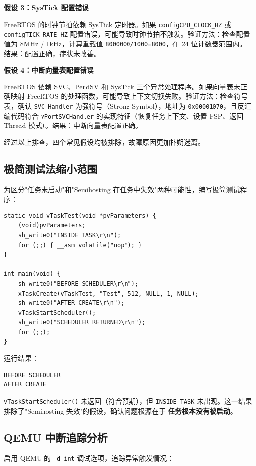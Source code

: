\documentclass[12pt,a4paper]{ctexart}
\begin{document}
\textbf{假设 3：SysTick 配置错误}

FreeRTOS 的时钟节拍依赖 SysTick 定时器。如果 \texttt{configCPU\_CLOCK\_HZ} 或 \texttt{configTICK\_RATE\_HZ} 配置错误，可能导致时钟节拍不触发。验证方法：检查配置值为 8MHz / 1kHz，计算重载值 \texttt{8000000/1000=8000}，在 24 位计数器范围内。结果：配置正确，症状未改善。

\textbf{假设 4：中断向量表配置错误}

FreeRTOS 依赖 SVC、PendSV 和 SysTick 三个异常处理程序。如果向量表未正确映射 FreeRTOS 的处理函数，可能导致上下文切换失败。验证方法：检查符号表，确认 \texttt{SVC\_Handler} 为强符号（Strong Symbol），地址为 \texttt{0x00001070}，且反汇编代码符合 \texttt{vPortSVCHandler} 的实现特征（恢复任务上下文、设置 PSP、返回 Thread 模式）。结果：中断向量表配置正确。

经过以上排查，四个常见假设均被排除，故障原因更加扑朔迷离。

\subsection{极简测试法缩小范围}

为区分"任务未启动"和"Semihosting 在任务中失效"两种可能性，编写极简测试程序：

\begin{lstlisting}[caption={极简任务测试程序}]
static void vTaskTest(void *pvParameters) {
    (void)pvParameters;
    sh_write0("INSIDE TASK\r\n");
    for (;;) { __asm volatile("nop"); }
}

int main(void) {
    sh_write0("BEFORE SCHEDULER\r\n");
    xTaskCreate(vTaskTest, "Test", 512, NULL, 1, NULL);
    sh_write0("AFTER CREATE\r\n");
    vTaskStartScheduler();
    sh_write0("SCHEDULER RETURNED\r\n");
    for (;;);
}
\end{lstlisting}

运行结果：
\begin{verbatim}
BEFORE SCHEDULER
AFTER CREATE
\end{verbatim}

\texttt{vTaskStartScheduler()} 未返回（符合预期），但 \texttt{INSIDE TASK} 未出现。这一结果排除了"Semihosting 失效"的假设，确认问题根源在于 \textbf{任务根本没有被启动}。

\subsection{QEMU 中断追踪分析}

启用 QEMU 的 \texttt{-d int} 调试选项，追踪异常触发情况：
\end{document}
